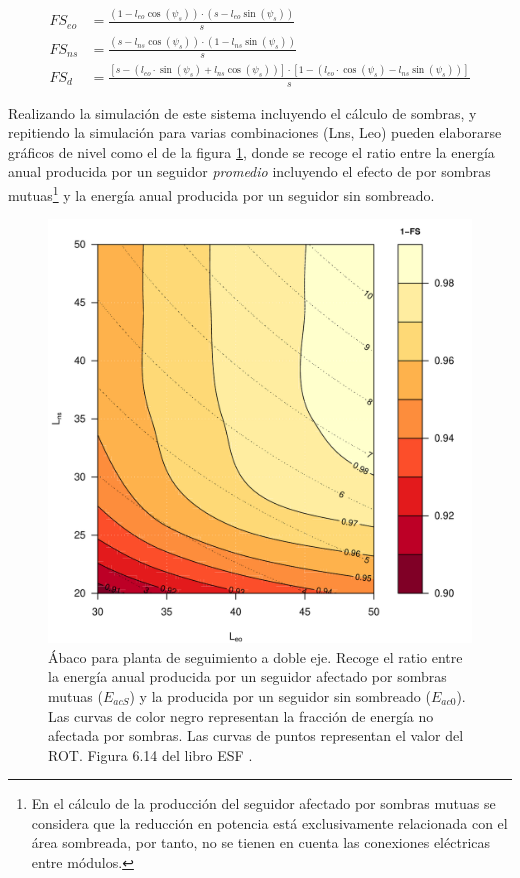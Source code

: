 \begin{align}
FS_{eo} & =\frac{(1-l_{eo}\cos(\psi_{s}))\cdot(s-l_{eo}\sin(\psi_{s}))}{s}\\
FS_{ns} & =\frac{(s-l_{ns}\cos(\psi_{s}))\cdot(1-l_{ns}\sin(\psi_{s}))}{s}\\
FS_{d} & =\frac{\left[s-\left(l_{eo}\cdot\sin(\psi_{s})+l_{ns}\cos(\psi_{s})\right)\right]\cdot\left[1-\left(l_{eo}\cdot\cos(\psi_{s})-l_{ns}\sin(\psi_{s})\right)\right]}{s}
\end{align}

Realizando la simulación de este sistema incluyendo el cálculo de sombras, y repitiendo la simulación para varias combinaciones (Lns, Leo) pueden elaborarse gráficos de nivel como el de la figura \ref{fig:abaco-sombras}, donde se recoge el ratio entre la energía anual producida por un seguidor \emph{promedio} incluyendo el efecto de por sombras mutuas\footnote{En el cálculo de la producción del seguidor afectado por sombras mutuas se considera que la reducción en potencia está exclusivamente relacionada con el área sombreada, por tanto, no se tienen en cuenta las conexiones eléctricas entre módulos.} y la energía anual producida por un seguidor sin sombreado.
\begin{figure}[htbp]
\centering
\includegraphics[height=0.4\textheight]{figuras/AbacoSombras.pdf}
\caption{Ábaco para planta de seguimiento a doble eje. Recoge el ratio entre la energía anual producida por un seguidor afectado por sombras mutuas (\(E_{acS}\)) y la producida por un seguidor sin sombreado (\(E_{ac0}\)). Las curvas de color negro representan la fracción de energía no afectada por sombras. Las curvas de puntos representan el valor del ROT. Figura 6.14 del libro ESF \cite{Perpinan2023}. \label{fig:abaco-sombras}}
\end{figure}

